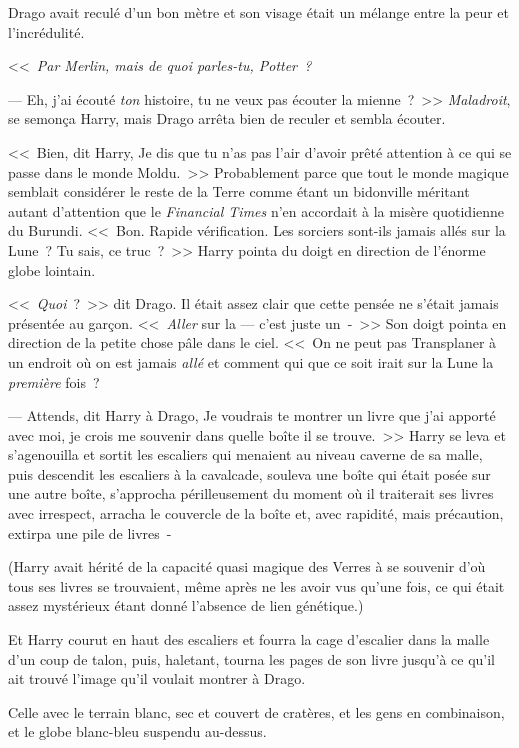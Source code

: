 Drago avait reculé d'un bon mètre et son visage était un mélange entre la peur et l'incrédulité.

<<~\emph{Par Merlin, mais de quoi parles-tu, Potter~?}

--- Eh, j'ai écouté \emph{ton} histoire, tu ne veux pas écouter la mienne~?~>> \emph{Maladroit}, se semonça Harry, mais Drago arrêta bien de reculer et sembla écouter.

<<~Bien, dit Harry, Je dis que tu n'as pas l'air d'avoir prêté attention à ce qui se passe dans le monde Moldu.~>> Probablement parce que tout le monde magique semblait considérer le reste de la Terre comme étant un bidonville méritant autant d'attention que le \emph{Financial Times} n'en accordait à la misère quotidienne du Burundi. <<~Bon. Rapide vérification. Les sorciers sont-ils jamais allés sur la Lune~? Tu sais, ce truc~?~>> Harry pointa du doigt en direction de l'énorme globe lointain.

<<~\emph{Quoi}~?~>> dit Drago. Il était assez clair que cette pensée ne s'était jamais présentée au garçon. <<~\emph{Aller} sur la — c'est juste un~-~>> Son doigt pointa en direction de la petite chose pâle dans le ciel. <<~On ne peut pas Transplaner à un endroit où on est jamais \emph{allé} et comment qui que ce soit irait sur la Lune la \emph{première} fois~?

--- Attends, dit Harry à Drago, Je voudrais te montrer un livre que j'ai apporté avec moi, je crois me souvenir dans quelle boîte il se trouve.~>> Harry se leva et s'agenouilla et sortit les escaliers qui menaient au niveau caverne de sa malle, puis descendit les escaliers à la cavalcade, souleva une boîte qui était posée sur une autre boîte, s'approcha périlleusement du moment où il traiterait ses livres avec irrespect, arracha le couvercle de la boîte et, avec rapidité, mais précaution, extirpa une pile de livres~-

(Harry avait hérité de la capacité quasi magique des Verres à se souvenir d'où tous ses livres se trouvaient, même après ne les avoir vus qu'une fois, ce qui était assez mystérieux étant donné l'absence de lien génétique.)

Et Harry courut en haut des escaliers et fourra la cage d'escalier dans la malle d'un coup de talon, puis, haletant, tourna les pages de son livre jusqu'à ce qu'il ait trouvé l'image qu'il voulait montrer à Drago.

Celle avec le terrain blanc, sec et couvert de cratères, et les gens en combinaison, et le globe blanc-bleu suspendu au-dessus.

